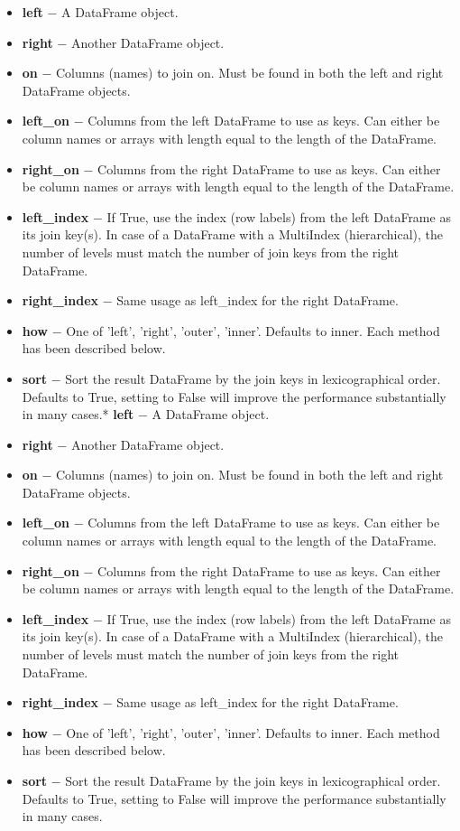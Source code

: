 \documentclass[11pt]{article}
\providecommand{\tightlist}{%
      \setlength{\itemsep}{0pt}\setlength{\parskip}{0pt}}
\begin{document}
\begin{itemize}
\tightlist
\item
  \textbf{left} − A DataFrame object.
\item
  \textbf{right} − Another DataFrame object.
\item
  \textbf{on} − Columns (names) to join on. Must be found in both the
  left and right DataFrame objects.
\item
  \textbf{left\_on} − Columns from the left DataFrame to use as keys.
  Can either be column names or arrays with length equal to the length
  of the DataFrame.
\item
  \textbf{right\_on} − Columns from the right DataFrame to use as keys.
  Can either be column names or arrays with length equal to the length
  of the DataFrame.
\item
  \textbf{left\_index} − If True, use the index (row labels) from the
  left DataFrame as its join key(s). In case of a DataFrame with a
  MultiIndex (hierarchical), the number of levels must match the number
  of join keys from the right DataFrame.
\item
  \textbf{right\_index} − Same usage as left\_index for the right
  DataFrame.
\item
  \textbf{how} − One of 'left', 'right', 'outer', 'inner'. Defaults to
  inner. Each method has been described below.
\item
  \textbf{sort} − Sort the result DataFrame by the join keys in
  lexicographical order. Defaults to True, setting to False will improve
  the performance substantially in many cases.* \textbf{left} − A
  DataFrame object.
\item
  \textbf{right} − Another DataFrame object.
\item
  \textbf{on} − Columns (names) to join on. Must be found in both the
  left and right DataFrame objects.
\item
  \textbf{left\_on} − Columns from the left DataFrame to use as keys.
  Can either be column names or arrays with length equal to the length
  of the DataFrame.
\item
  \textbf{right\_on} − Columns from the right DataFrame to use as keys.
  Can either be column names or arrays with length equal to the length
  of the DataFrame.
\item
  \textbf{left\_index} − If True, use the index (row labels) from the
  left DataFrame as its join key(s). In case of a DataFrame with a
  MultiIndex (hierarchical), the number of levels must match the number
  of join keys from the right DataFrame.
\item
  \textbf{right\_index} − Same usage as left\_index for the right
  DataFrame.
\item
  \textbf{how} − One of 'left', 'right', 'outer', 'inner'. Defaults to
  inner. Each method has been described below.
\item
  \textbf{sort} − Sort the result DataFrame by the join keys in
  lexicographical order. Defaults to True, setting to False will improve
  the performance substantially in many cases.
\end{itemize}
\end{document}
